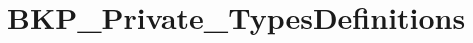 \hypertarget{group___b_k_p___private___types_definitions}{\section{B\-K\-P\-\_\-\-Private\-\_\-\-Types\-Definitions}
\label{group___b_k_p___private___types_definitions}
}
